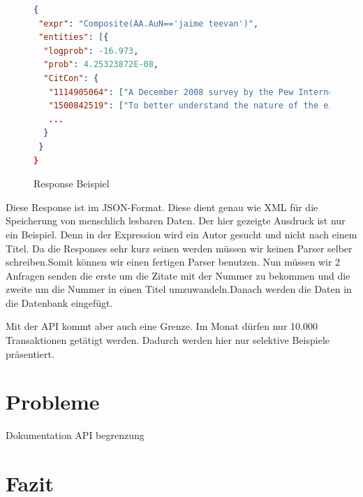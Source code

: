 \documentclass[a4paper,12pt]{article}
\begin{document}
	\begin{figure}[!htb]
		\begin{lstlisting}[language=json]
{
 "expr": "Composite(AA.AuN=='jaime teevan')",
 "entities": [{
  "logprob": -16.973,
  "prob": 4.25323872E-08,
  "CitCon": {
   "1114905064": ["A December 2008 survey by the Pew Internet Project [20] found 35% of adult internet users in the U.", "For example, the number of adults with social network profiles quadrupled between 2005 and 2008 [20], and users over 35 are the fastestgrowing Facebook demographic [11]."],
   "1500842519": ["To better understand the nature of the example questions provided by respondents, two of the authors used an affinity diagramming technique [6] to iteratively develop a classification scheme for question type and question topic."],
   ...
  }
 }
}
		\end{lstlisting}
		\caption{Response Beispiel}
	\end{figure}
	
	Diese Response ist im JSON-Format. Diese dient genau wie XML für die Speicherung von menschlich lesbaren Daten. Der hier gezeigte Ausdruck ist nur ein Beispiel. Denn in der Expression wird ein Autor gesucht und nicht nach einem Titel. Da die Responses sehr kurz seinen werden müssen wir keinen Parser selber schreiben.Somit können wir einen fertigen Parser benutzen. Nun müssen wir 2 Anfragen senden die erste um die Zitate mit der Nummer zu bekommen und die zweite um die Nummer in einen Titel umzuwandeln.Danach werden die Daten in die Datenbank eingefügt. 
	
	Mit der API kommt aber auch eine Grenze. Im Monat dürfen nur 10.000 Transaktionen getätigt werden. Dadurch werden hier nur selektive Beispiele präsentiert. 
	
	\section{Probleme}
	Dokumentation
	API begrenzung
	
	
	\section{Fazit}
	\begin{appendix}
	\end{appendix}
\end{document}
